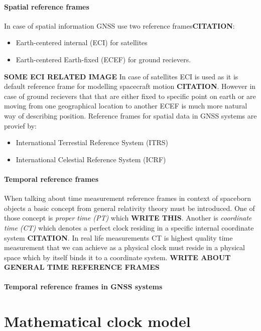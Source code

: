 \paragraph{Spatial reference frames}
In case of spatial information GNSS use two reference frames\textbf{CITATION}:
\begin{itemize}
	\item Earth-centered internal (ECI) for satellites
	\item Earth-centered Earth-fixed (ECEF) for ground recievers.
\end{itemize}
\textbf{SOME ECI RELATED IMAGE}
In case of satellites ECI is used as it is default reference frame for modelling spacecraft
motion \textbf{CITATION}. However in case of ground recievers that that are either fixed to 
specific point on earth or are moving from one geographical location to another ECEF is much
more natural way of describing position.
Reference frames for spatial data in GNSS systems are provief by:
\begin{itemize}
	\item International Terrestial Reference System (ITRS)
	\item International Celestial Reference System (ICRF)
\end{itemize}

\paragraph{Temporal reference frames}
When talking about time measurement reference frames in context of spaceborn objects a basic
concept from general relativity theory must be introduced.
One of those concept is \emph{proper time (PT)} which \textbf{WRITE THIS}.
Another is \emph{coordinate time (CT)} which denotes a perfect clock residing in a specific 
internal coordinate system \textbf{CITATION}.
In real life measurements CT is highest quality time measurement that we can achieve as a 
physical clock must reside in a physical space which by itself binds it to a coordinate system.
\textbf{WRITE ABOUT GENERAL TIME REFERENCE FRAMES}

\paragraph{Temporal reference frames in GNSS systems}


\section{Mathematical clock model}

